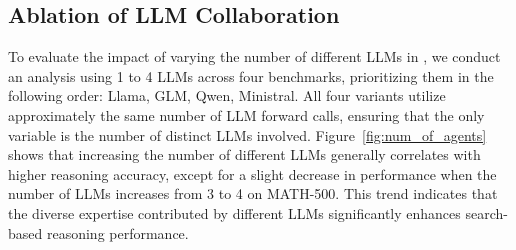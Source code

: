 




\subsection{Ablation of LLM Collaboration}
\label{sec:analysis:number_of_agents}

To evaluate the impact of varying the number of different LLMs in \mosa{}, we conduct an analysis using 1 to 4 LLMs across four benchmarks, prioritizing them in the following order: Llama, GLM, Qwen, Ministral.
All four variants utilize approximately the same number of LLM forward calls, ensuring that the only variable is the number of distinct LLMs involved. 
Figure~\ref{fig:num_of_agents} shows that increasing the number of different LLMs generally correlates with higher reasoning accuracy, except for a slight decrease in performance when the number of LLMs increases from 3 to 4 on MATH-500. 
This trend indicates that the diverse expertise contributed by different LLMs significantly enhances search-based reasoning performance.





